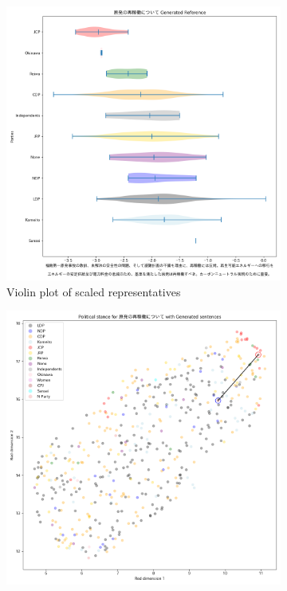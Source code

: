 \documentclass[final,5p,times,twocolumn,authoryear]{elsarticle}
\begin{document}
\begin{figure}[h]
\centering
    \begin{subfigure}{0.22\textwidth}
      \centering
      \includegraphics[width=1\linewidth]{figs/results/nuclear/restarting_gen_violin_plot.png}
      \caption{Violin plot of scaled representatives}
      \label{fig:sub1}
    \end{subfigure}
    \begin{subfigure}{0.22\textwidth}
      \centering
      \includegraphics[width=1\linewidth]{figs/results/nuclear/restarting_umap_gen.png}

\end{subfigure}
\end{figure}
\end{document}
